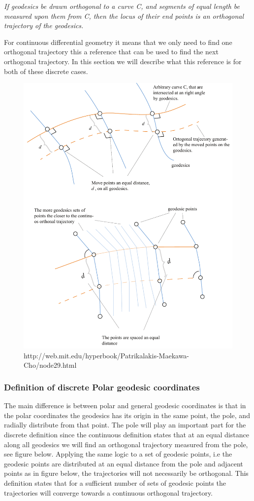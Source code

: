 \vspace{5mm}
\textit{ If geodesics be drawn orthogonal to a curve C, and segments of equal length be measured upon them from C, then the locus of their end points is an orthogonal trajectory of the geodesics.} 
\vspace{5mm}

For continuous differential geometry it means that we only need to find one orthogonal trajectory this a reference that can be used to find the next orthogonal trajectory. In this section we will describe what this reference is for both of these discrete cases.


\begin{figure}[H]
\centering
\includegraphics[width = 0.8\linewidth ]{figure/Method/geodesicDefintion.pdf}
\caption{http://web.mit.edu/hyperbook/Patrikalakis-Maekawa-Cho/node29.html}
\end{figure}


\subsubsection{Definition of discrete Polar geodesic coordinates}

The main difference is between polar and general geodesic coordinates is that in the polar coordinates the geodesics has its origin in the same point, the pole, and radially distribute from that point. The pole will play an important part for the discrete definition since the continuous definition states that at an equal distance along all geodesics we will find an orthogonal trajectory measured from the pole, see figure below.  Applying the same logic to a set of geodesic points, i.e the geodesic points are distributed at an equal distance from the pole and adjacent points as in figure below, the trajectories will not necessarily be orthogonal. This definition states that for a sufficient number of sets of geodesic points the trajectories will converge towards a continuous orthogonal trajectory. 

